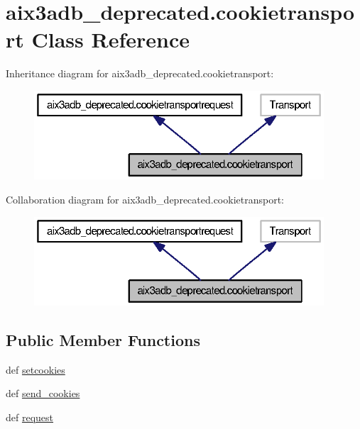 \section{aix3adb\-\_\-deprecated.\-cookietransport Class Reference}
\label{classaix3adb__deprecated_1_1cookietransport}


Inheritance diagram for aix3adb\-\_\-deprecated.\-cookietransport\-:
\nopagebreak
\begin{figure}[H]
\begin{center}
\leavevmode
\includegraphics[width=306pt]{classaix3adb__deprecated_1_1cookietransport__inherit__graph}
\end{center}
\end{figure}


Collaboration diagram for aix3adb\-\_\-deprecated.\-cookietransport\-:
\nopagebreak
\begin{figure}[H]
\begin{center}
\leavevmode
\includegraphics[width=306pt]{classaix3adb__deprecated_1_1cookietransport__coll__graph}
\end{center}
\end{figure}
\subsection*{Public Member Functions}
\begin{DoxyCompactItemize}
\item 
def \hyperlink{classaix3adb__deprecated_1_1cookietransportrequest_acf43b8f249daa9082719e48a1ea44f76}{setcookies}
\item 
def \hyperlink{classaix3adb__deprecated_1_1cookietransportrequest_a4b9a895b37c002bdc485015d03457660}{send\-\_\-cookies}
\item 
def \hyperlink{classaix3adb__deprecated_1_1cookietransportrequest_a35f43ced122820fb822fa1a374e57b29}{request}
\end{DoxyCompactItemize}
